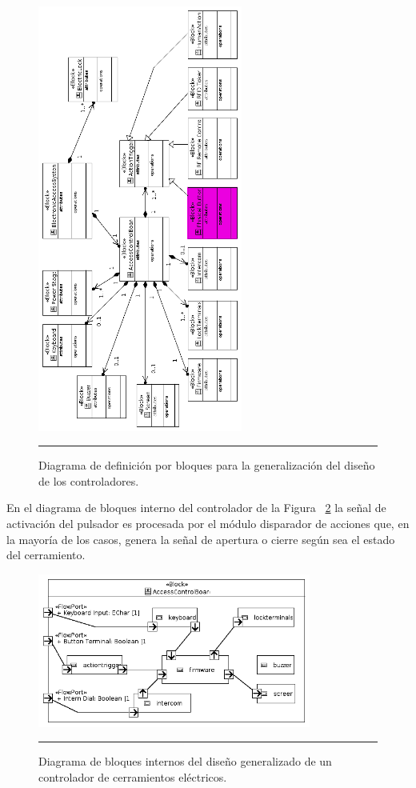\begin{figure}[htbp]
	\centering
	\includegraphics[width=0.6\textwidth]{Pictures/controller_bdd_baw_gimp.png}
	\rule{35em}{1pt}
	\caption[Diagrama Bloques Controlador]{Diagrama de definición por bloques para la generalización del diseño de los controladores.}
	\label{fig:controller_bdd}
\end{figure}
En el diagrama de bloques interno del controlador de la Figura ~\ref{fig:ibd_controladora} la señal de activación del pulsador es procesada por el módulo disparador de acciones que, en la mayoría de los casos, genera la señal de apertura o cierre según sea el estado del cerramiento.\\
\begin{figure}[htbp]
	\centering
	\includegraphics[width=0.8\textwidth]{Pictures/IBD_controladora_bw_gimp.png}
	\rule{35em}{1pt}
	\caption[Diagrama Bloques Internos Controlador]{Diagrama de bloques internos del diseño generalizado de un controlador de cerramientos eléctricos.}
	\label{fig:ibd_controladora}
\end{figure}
